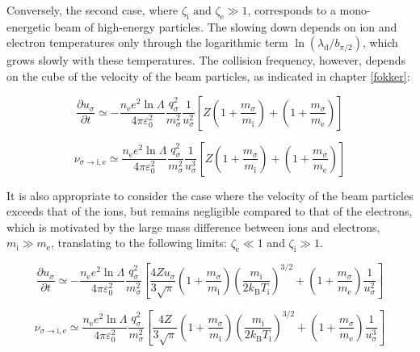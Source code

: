 Conversely, the second case, where $\zeta_\mathrm{i}\text{ and }\zeta_\text{e}\gg1$, corresponds to a mono-energetic beam of high-energy particles. The slowing down depends on ion and electron temperatures only through the logarithmic term $\ln{(\lambda_\mathrm{d}/b_{\pi/2})}$, which grows slowly with these temperatures. The collision frequency, however, depends on the cube of the velocity of the beam particles, as indicated in chapter \ref{fokker}:

\begin{equation}
    \frac{\partial u_\sigma}{\partial t}\simeq-\frac{n_\text{e}e^2\ln{\Lambda}}{4\pi\varepsilon_0^2}\frac{q_\sigma^2}{m_\sigma^2}\frac{1}{u_\sigma^2}\left[Z\left(1+\frac{m_\sigma}{m_\mathrm{i}}\right)+\left(1+\frac{m_\sigma}{m_\text{e}}\right)\right]
\end{equation}

\begin{equation}
    \nu_{\sigma\to\mathrm{i},\text{e}}\simeq\frac{n_\text{e}e^2\ln{\Lambda}}{4\pi\varepsilon_0^2}\frac{q_\sigma^2}{m_\sigma^2}\frac{1}{u_\sigma^3}\left[Z\left(1+\frac{m_\sigma}{m_\mathrm{i}}\right)+\left(1+\frac{m_\sigma}{m_\text{e}}\right)\right]
\end{equation}

It is also appropriate to consider the case where the velocity of the beam particles exceeds that of the ions, but remains negligible compared to that of the electrons, which is motivated by the large mass difference between ions and electrons, $m_\mathrm{i}\gg m_\text{e}$, translating to the following limits: $\zeta_\text{e}\ll1$ and $\zeta_\mathrm{i}\gg1$.

\begin{equation}
    \frac{\partial u_\sigma}{\partial t}\simeq-\frac{n_\text{e}e^2\ln{\Lambda}}{4\pi\varepsilon_0^2}\frac{q_\sigma^2}{m_\sigma^2}\left[\frac{4Zu_\sigma}{3\sqrt{\pi}}\left(1+\frac{m_\sigma}{m_\mathrm{i}}\right)\left(\frac{m_\mathrm{i}}{2 k_\mathrm{B}T_\mathrm{i}}\right)^{3/2}+\left(1+\frac{m_\sigma}{m_\text{e}}\right)\frac{1}{u_\sigma^2}\right]
\end{equation}

\begin{equation}
    \nu_{\sigma\to\mathrm{i},\text{e}}\simeq\frac{n_\text{e}e^2\ln{\Lambda}}{4\pi\varepsilon_0^2}\frac{q_\sigma^2}{m_\sigma^2}\left[\frac{4Z}{3\sqrt{\pi}}\left(1+\frac{m_\sigma}{m_\mathrm{i}}\right)\left(\frac{m_\mathrm{i}}{2 k_\mathrm{B}T_\mathrm{i}}\right)^{3/2}+\left(1+\frac{m_\sigma}{m_\text{e}}\right)\frac{1}{u_\sigma^3}\right]
\end{equation}


